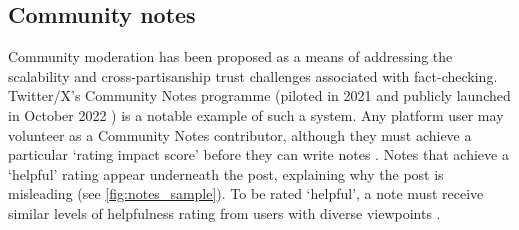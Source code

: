 


% 

\subsection{Community notes}

Community moderation has been proposed as a means of addressing the scalability \citep{martel2024crowdmisinfo} and cross-partisanship trust \citep{poynter2019republicans} challenges associated with fact-checking. 
Twitter/X's Community Notes programme (piloted in 2021 and publicly launched in October 2022 \citep{TwitterBirdwatch2021}) is a notable example of such a system.
Any platform user may volunteer as a Community Notes contributor, although they must achieve a particular `rating impact score' before they can write notes \citep{TwitterRatingWritingImpact}.
Notes that achieve a `helpful' rating appear underneath the post, explaining why the post is misleading (see \cref{fig:notes_sample}). To be rated `helpful', a note must receive similar levels of helpfulness rating from users with diverse viewpoints \citep{TwitterNoteRanking}.

